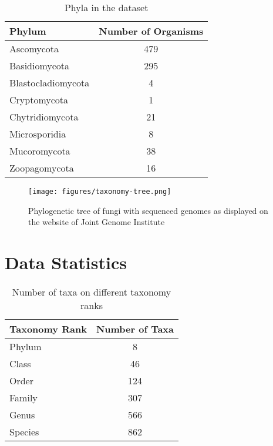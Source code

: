 \begin{table}
  \begin{center}
    \begin{tabular}{ | l | c | }
      \hline
      \textbf{Phylum} & \textbf{Number of Organisms} \\
      \hline
      Ascomycota & 479 \\
      Basidiomycota & 295 \\
      Blastocladiomycota & 4 \\
      Cryptomycota & 1 \\
      Chytridiomycota & 21 \\
      Microsporidia & 8 \\
      Mucoromycota & 38 \\
      Zoopagomycota & 16 \\
      \hline
    \end{tabular}
  \end{center}
  \caption{\label{table:data:num-organisms}Phyla in the dataset}
\end{table}

\begin{figure}
  \centering
  \texttt{[image: figures/taxonomy-tree.png]}
  \caption{Phylogenetic tree of fungi with sequenced genomes as displayed on
    the website of Joint Genome Institute \cite{grigoriev2014mycocosm}}
  \label{fig:data:tree}
\end{figure}

\section{\label{ch:data:stats}Data Statistics}

\begin{table}
  \begin{center}
    \begin{tabular}{ | l | c | }
      \hline
      \textbf{Taxonomy Rank} & \textbf{Number of Taxa} \\
      \hline
      Phylum & 8 \\
      Class & 46 \\
      Order & 124 \\
      Family & 307 \\
      Genus & 566 \\
      Species & 862 \\
      \hline
    \end{tabular}
  \end{center}
  \caption{Number of taxa on different taxonomy ranks}
\end{table}

